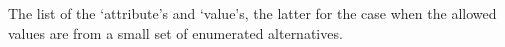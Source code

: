 \documentclass[aps, prx, showpacs, twocolumn, superscriptaddress, notitlepage, longbibliography, floatfix, nofootinbib]{revtex4-2}
\newif\ifIncremental
\newcommand{\myKey}[1]{$\whitearrowupfrombar$\textit{#1}}
\renewcommand{\myKey}[1]{\textit{#1}}
\renewcommand{\myKey}[1]{`{#1}'}
\newcommand{\val}[1]{\rotatebox[origin=c]{180}{$\whitearrowupfrombar$}\textit{#1}}
\renewcommand{\val}[1]{\myKey{#1}}
\newcommand{\separate}[1]
{
 #1
}
\begin{document}
\separate{The list of the \val{attribute}s and \val{value}s, the latter for the case when the allowed values are from a small set of enumerated alternatives.}

\begin{description}[leftmargin=5mm, topsep=0mm]

\end{description}


\nocite{*}


\ifIncremental

\else

\fi
\end{document}
